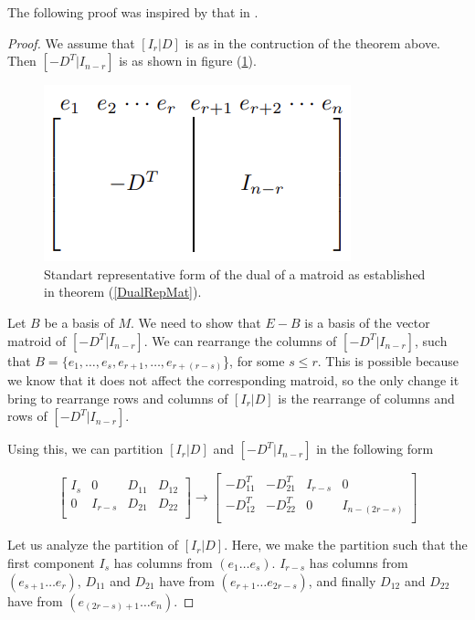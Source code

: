 The following proof was inspired by that in \cite{oxley1}.

\begin{proof}
    We assume that $[I_r|D]$ is as in the contruction of the theorem above. Then $[-D^T|I_{n-r}]$ is as shown in figure (\ref{MatRepresentationDual}).
    \begin{figure}[h]
        \centering
        \includegraphics{VMRDual.png}
        \caption{Standart representative form of the dual of a matroid as established in theorem (\ref{DualRepMat}). \cite{oxley1}} 
        \label{MatRepresentationDual}
    \end{figure}

    Let $B$ be a basis of $M$. We need to show that $E-B$ is a basis of the vector matroid of $[-D^T|I_{n-r}]$. We can rearrange the columns of $[-D^T|I_{n-r}]$, such that $B=\{e_1,\dots,e_s, e_{r+1}, \dots, e_{r+(r-s)}$\}, for some $s \leq r$. This is possible because we know that it does not affect the corresponding matroid, so the only change it bring to rearrange rows and columns of $[I_r|D]$ is the rearrange of columns and rows of $[-D^T|I_{n-r}]$. 
    
    Using this, we can partition $[I_r|D]$ and $[-D^T|I_{n-r}]$ in the following form
    \begin{figure}[H]
    $$\begin{bmatrix}
    I_s & 0 & D_{11} & D_{12}\\
    0 & I_{r-s} & D_{21} & D_{22}\\
    \end{bmatrix}
    \rightarrow
    \begin{bmatrix}
    -D_{11}^T & -D_{21}^T & I_{r-s} & 0\\
    -D_{12}^T & -D_{22}^T & 0 & I_{n-(2r-s)}\\
    \end{bmatrix}$$
    \end{figure}
    Let us analyze the partition of $[I_r|D]$.
    Here, we make the partition such that the first component $I_s$ has columns from $(e_1 \dots e_s)$. $I_{r-s}$ has columns from $(e_{s+1} \dots e_r)$, $D_11$ and $D_21$ have from $(e_{r+1} \dots e_{2r-s})$, and finally $D_{12}$ and $D_{22}$ have from $(e_{(2r-s)+1} \dots e_n)$.
    

\end{proof}
